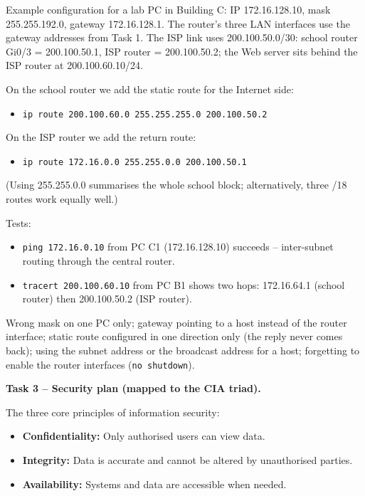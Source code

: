 \documentclass[11pt]{article}
\begin{document}
Example configuration for a lab PC in Building C: IP 172.16.128.10, mask 255.255.192.0, gateway 172.16.128.1. The router's three LAN interfaces use the gateway addresses from Task 1. The ISP link uses 200.100.50.0/30: school router Gi0/3 = 200.100.50.1, ISP router = 200.100.50.2; the Web server sits behind the ISP router at 200.100.60.10/24.

On the school router we add the static route for the Internet side:
\begin{itemize}
\item \texttt{ip route 200.100.60.0 255.255.255.0 200.100.50.2}
\end{itemize}
On the ISP router we add the return route:
\begin{itemize}
\item \texttt{ip route 172.16.0.0 255.255.0.0 200.100.50.1}
\end{itemize}
(Using 255.255.0.0 summarises the whole school block; alternatively, three /18 routes work equally well.)

Tests:
\begin{itemize}
\item \texttt{ping 172.16.0.10} from PC C1 (172.16.128.10) succeeds -- inter-subnet routing through the central router.
\item \texttt{tracert 200.100.60.10} from PC B1 shows two hops: 172.16.64.1 (school router) then 200.100.50.2 (ISP router).
\end{itemize}

\begin{attention}
Wrong mask on one PC only; gateway pointing to a host instead of the router interface; static route configured in one direction only (the reply never comes back); using the subnet address or the broadcast address for a host; forgetting to enable the router interfaces (\texttt{no shutdown}).
\end{attention}

\textbf{Task 3 -- Security plan (mapped to the CIA triad).}

\begin{definition}
The three core principles of information security:
\begin{itemize}
\item \textbf{Confidentiality:} Only authorised users can view data.
\item \textbf{Integrity:} Data is accurate and cannot be altered by unauthorised parties.
\item \textbf{Availability:} Systems and data are accessible when needed.
\end{itemize}
\end{definition}
\end{document}
